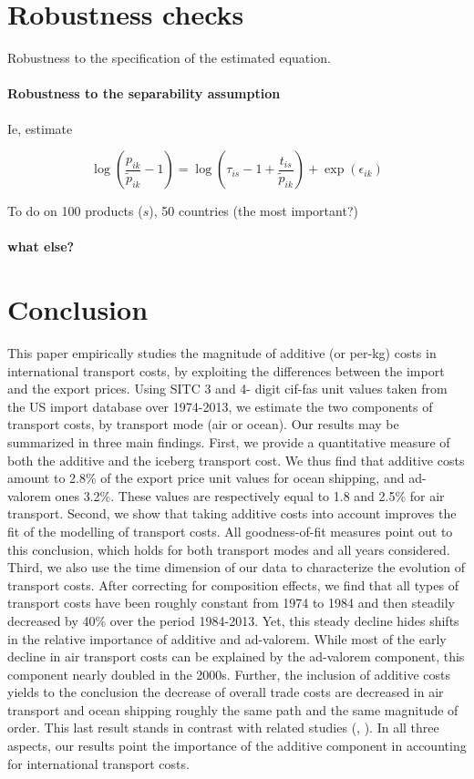 \documentclass[a4paper,11pt]{article}
\begin{document}
\section{Robustness checks}

Robustness to the specification of the estimated equation. 


\paragraph{Robustness to the separability assumption}


Ie, estimate


$$\log(\frac{p_{ik}}{\widetilde{p}_{ik}} -1)= \log(\tau_{is} -1+ \frac{t_{is}}{\widetilde{p}_{ik}})+ \exp(\epsilon_{ik})$$

To do on 100 products ($s$), 50 countries (the most important?) 

\paragraph{what else?}

\section{Conclusion \label{sec:conclu}}

This paper empirically studies the magnitude of additive (or per-kg) costs in international transport costs, by exploiting the differences between the import and the export prices. Using SITC 3 and 4- digit cif-fas unit values taken from the US import database over 1974-2013, we estimate the two components of transport costs, by transport mode (air or ocean).  Our results may be summarized in three main findings. First, we provide a quantitative measure of both the additive and the iceberg transport cost. We thus find that additive costs amount to 2.8\% of the export price unit values for ocean shipping, and ad-valorem ones 3.2\%. These values are respectively equal to 1.8 and 2.5\% for air transport. Second, we show that taking additive costs into account improves the fit of the modelling of transport costs. All goodness-of-fit measures point out to this conclusion, which holds for both transport modes and all years considered. Third, we also use the time dimension of our data to characterize the evolution of transport costs. After correcting for composition effects, we find that all types of transport costs have been roughly constant from 1974 to 1984 and then steadily decreased by 40\% over the period 1984-2013. Yet, this steady decline hides shifts in the relative importance of additive and ad-valorem. While most of the early decline in air transport costs can be explained by the ad-valorem component, this component nearly doubled in the 2000s. Further, the inclusion of additive costs yields to the conclusion the decrease of overall trade costs are decreased in air transport and ocean shipping roughly the same path and the same magnitude of order. This last result stands in contrast with related studies (\citealp{hummels2007}, \citealp{Behar_Venables}). In all three aspects, our results point the importance of the additive component in accounting for international transport costs.
\end{document}

